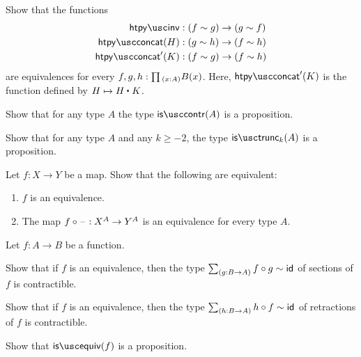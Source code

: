 \begin{exercises}
\item Show that the functions
\begin{align*}
\htpyinv & : (f \htpy g) \to (g \htpy f) \\
\htpyconcat(H) & : (g \htpy h) \to (f \htpy h) \\
\htpyconcat'(K) & : (f \htpy g) \to (f \htpy h)
\end{align*}
are equivalences for every $f,g,h : \prd{x:A}B(x)$. Here, $\htpyconcat'(K)$ is the function defined by $H\mapsto \ct{H}{K}$.
\item \label{ex:isprop_istrunc}
\begin{subexenum}
\item Show that for any type $A$ the type $\iscontr(A)$ is a proposition. %
\item Show that for any type $A$ and any $k\geq-2$, the type $\istrunc{k}(A)$ is a proposition.
\end{subexenum}
\item \label{lem:postcomp_equiv}
Let $f:X\to Y$ be a map. Show that the following are equivalent:
\begin{enumerate}
\item $f$ is an equivalence.
\item The map $f\circ\mathord{\hspace{1pt}\text{--}\hspace{1pt}} : X^A\to Y^A$ is an equivalence for every type $A$.
\end{enumerate}
\item \label{ex:isprop_isequiv}Let $f:A\to B$ be a function.
\begin{subexenum}
\item Show that if $f$ is an equivalence, then the type $\sm{g:B\to A}f\circ g\htpy \idfunc$ of sections of $f$ is contractible.
\item Show that if $f$ is an equivalence, then the type $\sm{h:B\to A}h\circ f\htpy \idfunc$ of retractions of $f$ is contractible.
\item Show that $\isequiv(f)$ is a proposition.

\end{subexenum}
\end{exercises}
